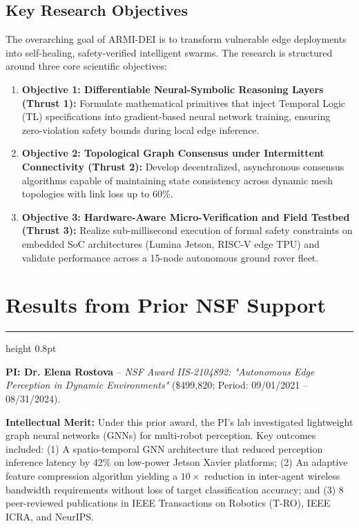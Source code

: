 \documentclass[11pt,letterpaper]{scrartcl}
\newcommand{\sectionline}{%
  \vspace{-0.5em}%
  {\color{NSFNavy}\hrule height 0.8pt}%
  \vspace{0.2em}%
}
\begin{document}
\subsection{Key Research Objectives}
The overarching goal of ARMI-DEI is to transform vulnerable edge deployments into self-healing, safety-verified intelligent swarms. The research is structured around three core scientific objectives:

\begin{enumerate}
    \item \textbf{Objective 1: Differentiable Neural-Symbolic Reasoning Layers (Thrust 1):} Formulate mathematical primitives that inject Temporal Logic (TL) specifications into gradient-based neural network training, ensuring zero-violation safety bounds during local edge inference.
    \item \textbf{Objective 2: Topological Graph Consensus under Intermittent Connectivity (Thrust 2):} Develop decentralized, asynchronous consensus algorithms capable of maintaining state consistency across dynamic mesh topologies with link loss up to 60\%.
    \item \textbf{Objective 3: Hardware-Aware Micro-Verification and Field Testbed (Thrust 3):} Realize sub-millisecond execution of formal safety constraints on embedded SoC architectures (Lumina Jetson, RISC-V edge TPU) and validate performance across a 15-node autonomous ground rover fleet.
\end{enumerate}

\section{Results from Prior NSF Support}
\sectionline

\textbf{PI: Dr. Elena Rostova} -- \emph{NSF Award IIS-2104892: "Autonomous Edge Perception in Dynamic Environments"} (\$499,820; Period: 09/01/2021 -- 08/31/2024).

\textbf{Intellectual Merit:} Under this prior award, the PI's lab investigated lightweight graph neural networks (GNNs) for multi-robot perception. Key outcomes included: (1) A spatio-temporal GNN architecture that reduced perception inference latency by 42\% on low-power Jetson Xavier platforms; (2) An adaptive feature compression algorithm yielding a $10\times$ reduction in inter-agent wireless bandwidth requirements without loss of target classification accuracy; and (3) 8 peer-reviewed publications in IEEE Transactions on Robotics (T-RO), IEEE ICRA, and NeurIPS.
\end{document}
